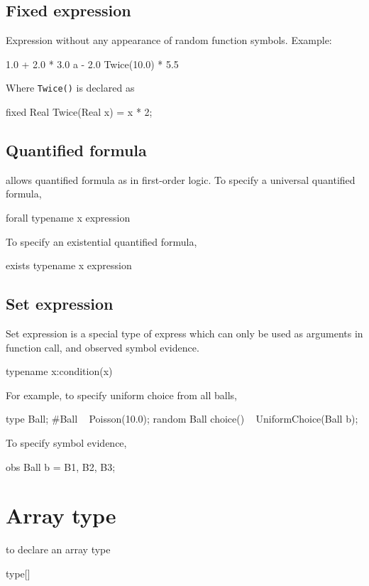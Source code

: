 \documentclass[12pt]{article}
\begin{document}
\subsection{Fixed expression}
Expression without any appearance of random function symbols. 
Example:
\begin{blogcode}
1.0 + 2.0 * 3.0
a - 2.0
Twice(10.0) * 5.5
\end{blogcode}
Where \texttt{Twice(\mycdot)} is declared as 
\begin{blogcode}
fixed Real Twice(Real x) = x * 2;
\end{blogcode}

\subsection{Quantified formula}
\bl allows quantified formula as in first-order logic. To specify a universal quantified formula, 
\begin{blogcode}
forall typename x expression
\end{blogcode}
To specify an existential quantified formula,
\begin{blogcode}
exists typename x expression
\end{blogcode}

\subsection{Set expression}
Set expression is a special type of express which can only be used as arguments in function call, and observed symbol evidence. 
\begin{blogcode}
{typename x:condition(x)}
\end{blogcode}

For example, to specify uniform choice from all balls,
\begin{blogcode}
type Ball;
#Ball ~ Poisson(10.0);
random Ball choice() ~ UniformChoice({Ball b});
\end{blogcode}

To specify symbol evidence,
\begin{blogcode}
obs {Ball b} = {B1, B2, B3};
\end{blogcode}

\section{Array type}
to declare an array type
\begin{blogcode}
type[]
\end{blogcode}
\end{document}

